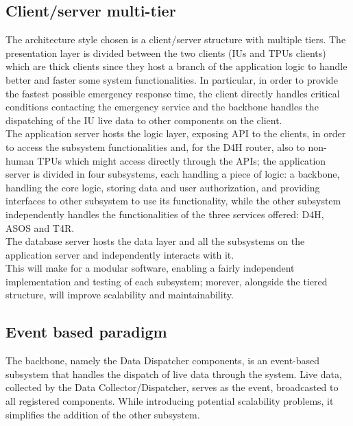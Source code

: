 \subsection{Client/server multi-tier}
The architecture style chosen is a client/server structure with multiple tiers. The presentation layer is divided between the two clients (IUs and TPUs clients) which are thick clients since they host a branch of the application logic to handle better and faster some system functionalities. In particular, in order to provide the fastest possible emergency response time, the client directly handles critical conditions contacting the emergency service and the backbone handles the dispatching of the IU live data to other components on the client. \\
The application server hosts the logic layer, exposing API to the clients, in order to access the subsystem functionalities and, for the D4H router, also to non-human TPUs which might access directly through the APIs; the application server is divided in four subsystems, each handling a piece of logic: a backbone, handling the core logic, storing data and user authorization, and providing interfaces to other subsystem to use its functionality, while the other subsystem independently handles the functionalities of the three services offered: D4H, ASOS and T4R. \\
The database server hosts the data layer and all the subsystems on the application server and independently interacts with it.
\\
This will make for a modular software, enabling a fairly independent implementation and testing of each subsystem; morever, alongside the tiered structure, will improve scalability and maintainability.

\subsection{Event based paradigm}
The backbone, namely the Data Dispatcher components, is an event-based subsystem that handles the dispatch of live data through the system. Live data, collected by the Data Collector/Dispatcher, serves as the event, broadcasted to all registered components. While introducing potential scalability problems, it simplifies the addition of the other subsystem.

